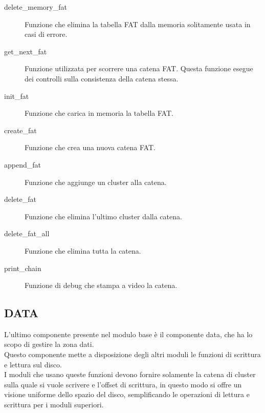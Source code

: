   \begin{description}
   \item[delete\_memory\_fat] Funzione che elimina la tabella FAT dalla memoria solitamente usata in casi di errore.
  \end{description}
    \begin{description}
   \item[get\_next\_fat]Funzione utilizzata per scorrere una catena FAT. Questa funzione esegue dei controlli sulla consistenza della catena stessa.
  \end{description} 
    \begin{description}
   \item[init\_fat]Funzione che carica in memoria la tabella FAT.  
   \end{description}
  \begin{description}
   \item[create\_fat ] Funzione che crea una nuova catena FAT.
  \end{description}  
  \begin{description}
   \item[append\_fat]Funzione che aggiunge un cluster alla catena.
  \end{description}
  \begin{description}
   \item[delete\_fat]Funzione che elimina l'ultimo cluster dalla catena.
  \end{description}   
  \begin{description}
   \item[delete\_fat\_all]Funzione che elimina tutta la catena.
  \end{description}     
 \begin{description}
  \item[print\_chain] Funzione di debug che stampa a video la catena. 
  \end{description}     
    

\subsection{DATA}
\label{sec:Data}
  L'ultimo componente presente nel modulo base è il componente data, che ha lo scopo di gestire la zona dati. \\
  Questo componente mette a disposizione degli altri moduli le funzioni di scrittura e lettura sul disco.\\
  I moduli che usano queste funzioni devono fornire solamente la catena di cluster sulla quale si vuole scrivere e l'offset di scrittura, in questo modo si offre un visione
  uniforme dello spazio del disco, semplificando le operazioni di lettura e scrittura per i moduli superiori.\\
  

